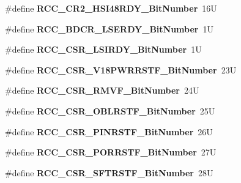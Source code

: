 \begin{DoxyCompactItemize}
\#define {\bfseries R\+C\+C\+\_\+\+C\+R2\+\_\+\+H\+S\+I48\+R\+D\+Y\+\_\+\+Bit\+Number}~16U
\item 
\mbox{\label{group___r_c_c___private___constants_gacb9413be7e02f6a7fd7e51e780211b86}} 
\#define {\bfseries R\+C\+C\+\_\+\+B\+D\+C\+R\+\_\+\+L\+S\+E\+R\+D\+Y\+\_\+\+Bit\+Number}~1U
\item 
\mbox{\label{group___r_c_c___private___constants_gaf3d58d1abb579d117b3faaa4e9f7037c}} 
\#define {\bfseries R\+C\+C\+\_\+\+C\+S\+R\+\_\+\+L\+S\+I\+R\+D\+Y\+\_\+\+Bit\+Number}~1U
\item 
\mbox{\label{group___r_c_c___private___constants_gaac6c2a7c77337a1e68f2c3bc807c89e6}} 
\#define {\bfseries R\+C\+C\+\_\+\+C\+S\+R\+\_\+\+V18\+P\+W\+R\+R\+S\+T\+F\+\_\+\+Bit\+Number}~23U
\item 
\mbox{\label{group___r_c_c___private___constants_gaef661fb642cc30e68e55facef6f68b9f}} 
\#define {\bfseries R\+C\+C\+\_\+\+C\+S\+R\+\_\+\+R\+M\+V\+F\+\_\+\+Bit\+Number}~24U
\item 
\mbox{\label{group___r_c_c___private___constants_gad445a0d3b690e8041fd4b4710a2b651d}} 
\#define {\bfseries R\+C\+C\+\_\+\+C\+S\+R\+\_\+\+O\+B\+L\+R\+S\+T\+F\+\_\+\+Bit\+Number}~25U
\item 
\mbox{\label{group___r_c_c___private___constants_ga20cdf38c1587417c2705a05f54d9ce77}} 
\#define {\bfseries R\+C\+C\+\_\+\+C\+S\+R\+\_\+\+P\+I\+N\+R\+S\+T\+F\+\_\+\+Bit\+Number}~26U
\item 
\mbox{\label{group___r_c_c___private___constants_gaf1a5900fc4ee3ca087dfa4f6bee4e10a}} 
\#define {\bfseries R\+C\+C\+\_\+\+C\+S\+R\+\_\+\+P\+O\+R\+R\+S\+T\+F\+\_\+\+Bit\+Number}~27U
\item 
\mbox{\label{group___r_c_c___private___constants_ga9788d00048bb08f133c7e4aa4ce76705}} 
\#define {\bfseries R\+C\+C\+\_\+\+C\+S\+R\+\_\+\+S\+F\+T\+R\+S\+T\+F\+\_\+\+Bit\+Number}~28U
\item 

\end{DoxyCompactItemize}
